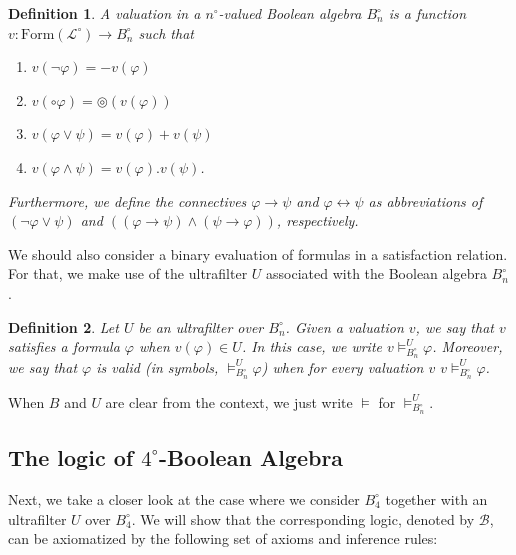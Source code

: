 \documentclass{amsart}
\newtheorem{definition}{Definition}[section]
\newcommand{\so}{\rightarrow}
\renewcommand{\iff}{\longleftrightarrow}
\newcommand{\cl}{\mathcal{L}}
\newcommand{\For}{\mathrm{Form}}
\begin{document}
\begin{definition}
    A valuation in a $n^\circ$-valued Boolean algebra $B^\circ_n$ is a function $v: \For(\cl^\circ) \longrightarrow B^\circ_n$ such that 
		\begin{enumerate}
			\item $v(\lnot \varphi) = - v(\varphi)$
			\item $v(\circ \varphi) = \circledcirc (v(\varphi))$
			\item $v(\varphi \lor \psi) = v(\varphi) + v(\psi)$
			\item $v(\varphi \land \psi) = v(\varphi) . v(\psi)$.
		\end{enumerate}
    Furthermore, we define the connectives $\varphi \so \psi$ and $\varphi \iff \psi$ as abbreviations of $(\lnot \varphi \lor \psi)$ and $((\varphi \so \psi) \land (\psi \so \varphi))$, respectively.
\end{definition}

We should also consider a binary evaluation of formulas in a satisfaction relation. For that, we make use of the ultrafilter $U$ associated with the Boolean algebra $B^\circ_n$.

\begin{definition}
	Let $U$ be an ultrafilter over $B^\circ_n$.
	Given a valuation $v$, we say that $v$ satisfies a formula $\varphi$ when $v(\varphi) \in U$. In this case, we write $v \vDash_{B^\circ_n}^U \varphi$.
	Moreover, we say that $\varphi$ is valid (in symbols, $\vDash_{B^\circ_n}^U \varphi$) when for every valuation $v$ $v \vDash_{B^\circ_n}^U \varphi$.
\end{definition} 


When $B$ and $U$ are clear from the context, we just write $\vDash$ for $\vDash_{B^\circ_n}^U$. 

\subsection{The logic of \texorpdfstring{$4^\circ$}{4-ball}-Boolean Algebra}\label{4-boolean}

Next, we take a closer look at the case where we consider $B^\circ_4$ together with an ultrafilter $U$ over $B^\circ_4$. We will show that the corresponding logic, denoted by $\mathcal{B}$, can be axiomatized by the following set of axioms and inference rules:
\end{document}
